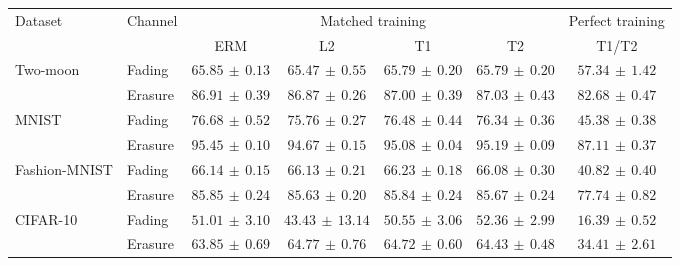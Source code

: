 \begin{tabular*}{\linewidth}{@{\extracolsep{\fill}}llccccc@{}}
\toprule
\multirow{2}{*}{Dataset} & \multirow{2}{*}{Channel} & \multicolumn{4}{c}{Matched training} & Perfect training \\
\cmidrule(lr){3-6}\cmidrule(l){7-7}
 & & ERM & L2 & T1 & T2 & T1/T2 \\
\midrule
\multirow{2}{*}{Two-moon} & Fading & $\mathbf{65.85}\,\pm\,0.13$ & $65.47\,\pm\,0.55$ & $65.79\,\pm\,0.20$ & $65.79\,\pm\,0.20$ & $57.34\,\pm\,1.42$ \\
 & Erasure & $86.91\,\pm\,0.39$ & $86.87\,\pm\,0.26$ & $87.00\,\pm\,0.39$ & $\mathbf{87.03}\,\pm\,0.43$ & $82.68\,\pm\,0.47$ \\
\midrule[0.25pt]
\multirow{2}{*}{MNIST} & Fading & $\mathbf{76.68}\,\pm\,0.52$ & $75.76\,\pm\,0.27$ & $76.48\,\pm\,0.44$ & $76.34\,\pm\,0.36$ & $45.38\,\pm\,0.38$ \\
 & Erasure & $\mathbf{95.45}\,\pm\,0.10$ & $94.67\,\pm\,0.15$ & $95.08\,\pm\,0.04$ & $95.19\,\pm\,0.09$ & $87.11\,\pm\,0.37$ \\
\midrule[0.25pt]
\multirow{2}{*}{Fashion-MNIST} & Fading & $66.14\,\pm\,0.15$ & $66.13\,\pm\,0.21$ & $\mathbf{66.23}\,\pm\,0.18$ & $66.08\,\pm\,0.30$ & $40.82\,\pm\,0.40$ \\
 & Erasure & $\mathbf{85.85}\,\pm\,0.24$ & $85.63\,\pm\,0.20$ & $85.84\,\pm\,0.24$ & $85.67\,\pm\,0.24$ & $77.74\,\pm\,0.82$ \\
\midrule[0.25pt]
\multirow{2}{*}{CIFAR-10} & Fading & $51.01\,\pm\,3.10$ & $43.43\,\pm\,13.14$ & $50.55\,\pm\,3.06$ & $\mathbf{52.36}\,\pm\,2.99$ & $16.39\,\pm\,0.52$ \\
 & Erasure & $63.85\,\pm\,0.69$ & $\mathbf{64.77}\,\pm\,0.76$ & $64.72\,\pm\,0.60$ & $64.43\,\pm\,0.48$ & $34.41\,\pm\,2.61$ \\
\bottomrule
\end{tabular*}
